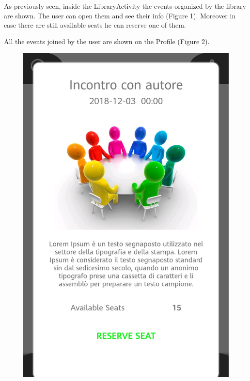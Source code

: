 \newpage
{}
As previously seen, inside the LibraryActivity the events organized by the library are shown. The user can open them and see their info (Figure 1). Moreover in case there are still available seats he can reserve one of them.\par
All the events joined by the user are shown on the Profile (Figure 2).
\begin{figure}[H]
	\centering
	\includegraphics[scale=0.15]{Images/UI/Events/1}
	\hspace{0.5cm}

\end{figure}

